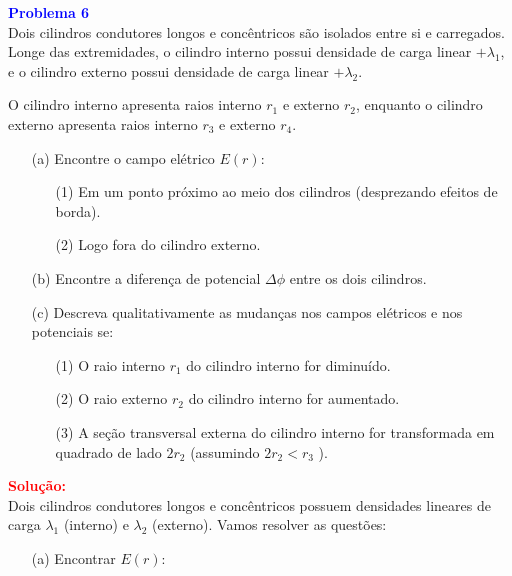 \documentclass[a4paper,12pt]{article}
\begin{document}
\begin{flushleft}
\textbf{\textcolor{blue}{\Large Problema 6}}\\

Dois cilindros condutores longos e concêntricos são isolados entre si e carregados. Longe das extremidades, 
o cilindro interno possui densidade de carga linear \( +\lambda_1 \), e o cilindro externo possui densidade de 
carga linear \( +\lambda_2 \).

O cilindro interno apresenta raios interno \( r_1 \) e externo \( r_2 \), enquanto o cilindro externo apresenta raios interno \( r_3 \) e externo \( r_4 \).

\begin{enumerate}
    \item[(a)] Encontre o campo elétrico \( E(r) \):
    \begin{enumerate}
        \item[(1)] Em um ponto próximo ao meio dos cilindros (desprezando efeitos de borda).
        \item[(2)] Logo fora do cilindro externo.
    \end{enumerate}

    \item[(b)] Encontre a diferença de potencial $\Delta\phi$ entre os dois cilindros.

    \item[(c)] Descreva qualitativamente as mudanças nos campos elétricos e nos potenciais se:
    \begin{enumerate}
        \item[(1)] O raio interno \( r_1 \) do cilindro interno for diminuído.
        \item[(2)] O raio externo \( r_2 \) do cilindro interno for aumentado.
        \item[(3)] A seção transversal externa do cilindro interno for transformada em
                   quadrado de lado \( 2r_2 \) (assumindo \( 2r_2 < r_3 \) ).
    \end{enumerate}
\end{enumerate}

\textcolor{red}{\textbf{Solução:}}\\

Dois cilindros condutores longos e concêntricos possuem densidades lineares de carga $\lambda_1$ (interno) e $\lambda_2$ (externo). Vamos resolver as questões:

\begin{itemize}
    \item[(a)] Encontrar $E(r)$:


\end{itemize}
\end{flushleft}
\end{document}
